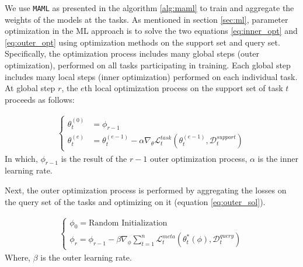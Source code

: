 
We use \verb|MAML| as presented in the algorithm \ref{alg:maml} to train and aggregate the weights of the models at the tasks. As mentioned in section \ref{sec:ml}, parameter optimization in the ML approach is to solve the two equations \ref{eq:inner_opt} and \ref{eq:outer_opt} using optimization methods on the support set and query set. Specifically, the optimization process includes many global steps (outer optimization), performed on all tasks participating in training. Each global step includes many local steps (inner optimization) performed on each individual task. At global step $r$, the $e$th local optimization process on the support set of task $t$ proceeds as follows:

\begin{align}
    \begin{cases}
        \theta_t^{(0)} &= \phi_{r-1} \\
        \theta_t^{(e)} &= \theta_t^{(e-1)} - \alpha \nabla_{\theta} \mathcal{L}^{task}_t\left( \theta_t^{(e-1)}, \mathcal{D}_t^{support} \right)
    \end{cases}
\end{align} In which, $\phi_{r-1}$ is the result of the $r-1$ outer optimization process, $\alpha$ is the inner learning rate.


Next, the outer optimization process is performed by aggregating the losses on the query set of the tasks and optimizing on it (equation \ref{eq:outer_sol}).

\begin{align}
    \begin{cases}
        \phi_0 = \text{Random Initialization}\\
        \phi_r = \phi_{r-1} - \beta \nabla_{\phi} \sum_{t=1}^n{\mathcal{L}^{meta}_t \left( \theta_t^*(\phi), \mathcal{D}_t^{query} \right)}
    \end{cases}
    \label{eq:outer_sol}
\end{align} Where, $\beta$ is the outer learning rate.

